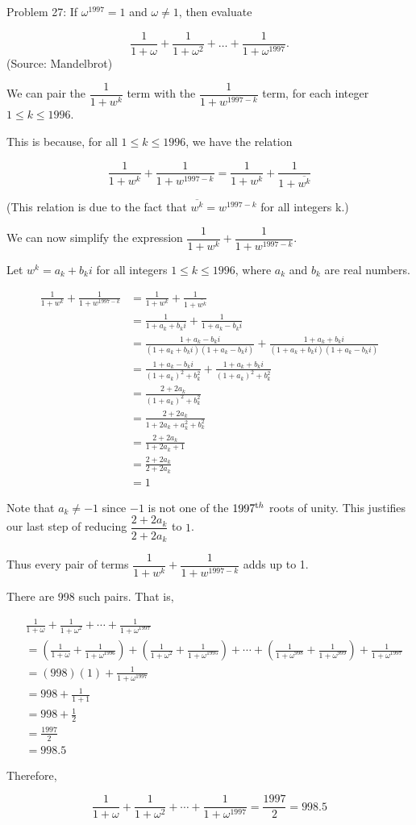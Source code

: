 Problem 27: If $\omega^{1997} = 1$ and $\omega \neq 1$, then evaluate

\[\frac{1}{1 + \omega} + \frac{1}{1 + \omega^2} + \dots + \frac{1}{1 + \omega^{1997}}.\] (Source: Mandelbrot)

We can pair the $\dfrac{1}{1 + w^k}$ term with the $\dfrac{1}{1 + w^{1997-k}}$ term, for each integer $1 \leq k \leq 1996$.

This is because, for all $1 \leq k \leq 1996$, we have the relation

$$\frac{1}{1 + w^k} + \frac{1}{1 + w^{1997-k}} = \frac{1}{1 + w^k} + \frac{1}{1 + \overline{w^k}}$$

(This relation is due to the fact that $\overline{w^k} = w^{1997-k}$ for all integers k.)

We can now simplify the expression $\dfrac{1}{1 + w^k} + \dfrac{1}{1 + w^{1997-k}}$.

Let $w^k = a_k + b_k i$ for all integers $1 \leq k \leq 1996$, where $a_k$ and $b_k$ are real numbers.

\begin{align*}
\frac{1}{1 + w^k} + \frac{1}{1 + w^{1997-k}} &= \frac{1}{1 + w^k} + \frac{1}{1 + \overline{w^k}} \\
&= \frac{1}{1 + a_k + b_ki} + \frac{1}{1 + a_k - b_ki} \\
&= \frac{1 + a_k - b_ki}{(1 + a_k + b_ki)(1 + a_k - b_ki)} + \frac{1 + a_k + b_ki}{(1 + a_k + b_ki)(1 + a_k - b_ki)} \\
&= \frac{1 + a_k - b_ki}{(1 + a_k)^2 + b_k^2} + \frac{1 + a_k + b_ki}{(1 + a_k)^2 + b_k^2} \\
&= \frac{2 + 2a_k}{(1 + a_k)^2 + b_k^2} \\
&= \frac{2 + 2a_k}{1 + 2a_k + a_k^2 + b_k^2} \\
&= \frac{2 + 2a_k}{1 + 2a_k + 1} \\
&= \frac{2 + 2a_k}{2 + 2a_k} \\
&= 1
\end{align*}

Note that $a_k \neq -1$ since $-1$ is not one of the $1997^{\text th}$ roots of unity. This justifies our last step of reducing $\dfrac{2 + 2a_k}{2 + 2a_k}$ to $1$.

Thus every pair of terms $\dfrac{1}{1 + w^k} + \dfrac{1}{1 + w^{1997-k}}$ adds up to 1.

There are 998 such pairs. That is,

\begin{align*}
& \frac{1}{1 + \omega} + \frac{1}{1 + \omega^2} + \cdots + \frac{1}{1 + \omega^{1997}} \\
&= \left(\frac{1}{1 + \omega} + \frac{1}{1 + \omega^{1996}}\right) + \left(\frac{1}{1 + \omega^2} + \frac{1}{1 + \omega^{1995}}\right) + \cdots + \left(\frac{1}{1 + \omega^{998}} + \frac{1}{1 + \omega^{999}}\right) + \frac{1}{1 + \omega^{1997}} \\
&= (998)(1) + \frac{1}{1 + \omega^{1997}} \\
&= 998+ \frac{1}{1 + 1} \\
&= 998+ \frac{1}{2} \\
&= \frac{1997}{2} \\
&= 998.5
\end{align*}

Therefore,

$$ \boxed{\frac{1}{1 + \omega} + \frac{1}{1 + \omega^2} + \cdots + \frac{1}{1 + \omega^{1997}} = \frac{1997}{2} = 998.5} $$
